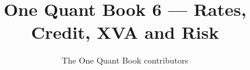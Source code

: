 \documentclass[11pt,a4paper,twoside,openany]{book}
\title{One Quant Book 6 --- Rates, Credit, XVA and Risk}
\author{The One Quant Book contributors}
\date{\bookdate}
\begin{document}
\frontmatter



\tableofcontents

\mainmatter


\appendix
\part{\omsolutionspart}


\backmatter
\printindex
\end{document}
